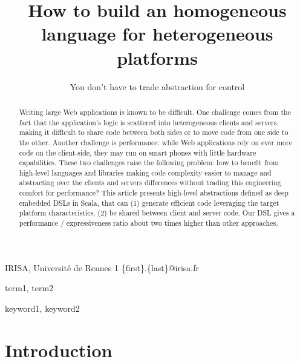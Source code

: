\documentclass[preprint]{sigplanconf}
\begin{document}
\copyrightdata{[to be supplied]} 


\title{How to build an homogeneous language for heterogeneous platforms}
\subtitle{You don’t have to trade abstraction for control}

           {IRISA, Université de Rennes 1}
           {\{first\}.\{last\}@irisa.fr}

\maketitle

\begin{abstract}
Writing large Web applications is known to be difficult. One challenge comes from the fact that the application's
logic is scattered into heterogeneous clients and servers, making it difficult to share code between both sides or to
move code from one side to the other. Another challenge is performance: while Web applications rely on ever more
code on the client-side, they may run on smart phones with little hardware capabilities. These two challenges raise
the following problem: how to benefit from high-level languages and libraries making code complexity easier to manage
and abstracting over the clients and servers differences without trading this engineering comfort for performance?
This article presents high-level abstractions defined as deep embedded DSLs in Scala, that can (1) generate efficient
code leveraging the target platform characteristics, (2) be shared between client and server code. Our DSL gives a
performance / expressiveness ratio about two times higher than other approaches.
\end{abstract}


\terms
term1, term2

\keywords
keyword1, keyword2

\section{Introduction}
\end{document}
